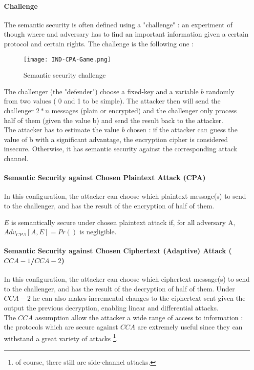 \paragraph{Challenge}
The semantic security is often defined using a "challenge" : an experiment of though where and adversary has to find an important information given a certain protocol and certain rights. The challenge is the following one :

\begin{figure}[ht!]
	\centering
		\texttt{[image: IND-CPA-Game.png]}
	\caption{Semantic security challenge}
	\label{fig:SemanticSecurityChallenge}
\end{figure}

The challenger (the "defender") choose a fixed-key and a variable $b$ randomly from two values ( 0 and 1 to be simple). The attacker then will send the challenger $2*n$ messages (plain or encrypted) and the challenger only process half of them (given the value b) and send the result back to the attacker.\\
The attacker has to estimate the value $b$ chosen : if the attacker can guess the value of b with a significant advantage, the encryption cipher is considered insecure. Otherwise, it has semantic security against the corresponding attack channel.

\paragraph{Semantic Security against Chosen Plaintext Attack (CPA)\\}

In this configuration, the attacker can choose which plaintext message(s) to send to the challenger, and has the result of the encryption of half of them. 

\begin{mytheorem}
    $E$ is semantically secure  under chosen plaintext attack if, for all adversary A, $Adv_{CPA}[A,E] = Pr()$ is negligible.
\end{mytheorem}

\paragraph{Semantic Security against Chosen Ciphertext (Adaptive) Attack ($CCA-1$/$CCA-2$)\\}

In this configuration, the attacker can choose which ciphertext message(s) to send to the challenger, and has the result of the decryption of half of them. Under $CCA-2$ he can also makes incremental changes to the ciphertext sent given the output the previous decryption, enabling linear and differential attacks. \\
The $CCA$ assumption allow the attacker a wide range of access to information : the protocols which are secure against $CCA$ are extremely useful since they can withstand a great variety of attacks \footnote{of course, there still are side-channel attacks.}.

